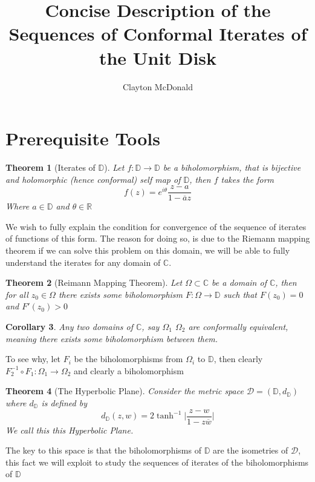 \documentclass{article}
\title{Concise Description of the Sequences of Conformal Iterates of the Unit Disk}
\author{Clayton McDonald}
\newcommand{\R}{\mathbb{R}}
\newcommand{\C}{\mathbb{C}}
\newcommand{\D}{\mathbb{D}}
\newtheorem{theorem}{Theorem}
\newtheorem{corollary}[theorem]{Corollary}
\begin{document}
\maketitle
\section{Prerequisite Tools}

\begin{theorem}[Iterates of $\D$]
    Let $f:\D\to\D$ be a biholomorphism, that is bijective and holomorphic (hence conformal) self map of $\D$, then $f$ takes the form
    \begin{equation*}
        f(z) = e^{i\theta} \frac{z-a}{1-\overline{a}z}
    \end{equation*}
Where $a\in\D$ and $\theta\in\R$
\end{theorem}
We wish to fully explain the condition for convergence of the sequence of iterates of functions of this form.
The reason for doing so, is due to the Riemann mapping theorem if we can solve this problem on this domain, we will be able to fully understand
the iterates for any domain of $\C$. 
\begin{theorem}[Reimann Mapping Theorem]
Let $\Omega\subset\C$ be a domain of $\C$, then for all $z_0\in\Omega$ there exists some biholomorphism $F:\Omega\to\D$ such that $F(z_0) = 0$ and $F'(z_0)>0$
\end{theorem}
\begin{corollary}
    Any two domains of $\C$, say $\Omega_1$ $\Omega_2$ are conformally equivalent, meaning there exists some biholomorphism between them.
\end{corollary}
To see why, let $F_i$ be the biholomorphisms from $\Omega_i$ to $\D$, then clearly $F_2^{-1} \circ F_1:\Omega_1\to\Omega_2$ and clearly a biholomorphism \\ 
\begin{theorem}[The Hyperbolic Plane]
    Consider the metric space $\mathcal{D} = (\D, d_\D)$ where $d_\D$ is defined by
    \begin{equation*}
        d_\D (z, w) = 2 \tanh^{-1}\bigg|\frac{z-w}{1-z\overline{w}} \bigg|
    \end{equation*}
We call this this Hyperbolic Plane.
\end{theorem}
The key to this space is that the biholomorphisms of $\D$ are the isometries of $\mathcal{D}$, this fact we will exploit to study the sequences of iterates of the biholomorphisms of $\D$
\end{document}
